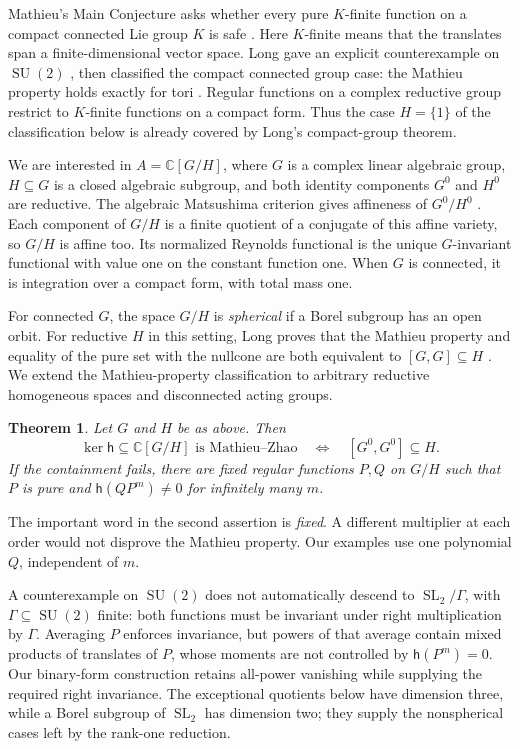\documentclass[11pt]{article}
\numberwithin{equation}{section}
\newtheorem{theorem}{Theorem}[section]
\theoremstyle{definition}
\theoremstyle{remark}
\newcommand{\C}{\mathbb C}
\newcommand{\h}{\mathsf h}
\newcommand{\SL}{\operatorname{SL}}
\newcommand{\SU}{\operatorname{SU}}
\begin{document}
Mathieu's Main Conjecture asks whether every pure $K$-finite function
on a compact connected Lie group $K$ is safe
\cite[pp.~264--265]{Mathieu}. Here $K$-finite means that the translates
span a finite-dimensional vector space. Long gave an explicit
counterexample on $\SU(2)$ \cite[Theorem~4.2]{LongSU2}, then classified
the compact connected group case: the Mathieu property holds exactly
for tori \cite[Theorem~1.1]{LongCompact}. Regular functions on a complex
reductive group restrict to $K$-finite functions on a compact form.
Thus the case $H=\{1\}$ of the classification below is already covered
by Long's compact-group theorem.

We are interested in $A=\C[G/H]$, where $G$ is a complex linear algebraic
group, $H\subseteq G$ is a closed algebraic subgroup, and both identity
components $G^0$ and $H^0$ are reductive. The algebraic Matsushima
criterion gives affineness of $G^0/H^0$
\cite[Proposition~2.2]{Arzhantsev}. Each component of $G/H$ is a finite
quotient of a conjugate of this affine variety, so $G/H$ is affine too.
Its normalized Reynolds functional is the unique $G$-invariant functional
with value one on the constant function one. When $G$ is connected, it
is integration over a compact form, with total mass one.

For connected $G$, the space $G/H$ is \emph{spherical} if a Borel
subgroup has an open orbit. For reductive $H$ in this setting, Long
proves that the Mathieu property and equality of the pure set with
the nullcone are both equivalent to $[G,G]\subseteq H$
\cite[Theorem~1.1]{LongSpherical}. We extend the Mathieu-property classification
to arbitrary reductive homogeneous spaces and disconnected acting groups.

\begin{theorem}\label{thm:classification}
Let $G$ and $H$ be as above. Then
\[
 \ker\h\subseteq\C[G/H]\text{ is Mathieu--Zhao}
 \quad\Longleftrightarrow\quad [G^0,G^0]\subseteq H.
\]
If the containment fails, there are fixed regular functions $P,Q$ on
$G/H$ such that $P$ is pure and $\h(QP^m)\ne0$ for infinitely many $m$.
\end{theorem}

The important word in the second assertion is \emph{fixed}. A different
multiplier at each order would not disprove the Mathieu property. Our
examples use one polynomial $Q$, independent of $m$.

A counterexample on $\SU(2)$ does not automatically descend to
$\SL_2/\Gamma$, with $\Gamma\subseteq\SU(2)$ finite: both functions must be invariant under right
multiplication by $\Gamma$. Averaging $P$ enforces invariance, but
powers of that average contain mixed products of translates of $P$,
whose moments are not controlled by $\h(P^m)=0$. Our binary-form
construction retains all-power vanishing while supplying the required
right invariance. The exceptional quotients below have dimension three,
while a Borel subgroup of $\SL_2$ has dimension two; they supply the
nonspherical cases left by the rank-one reduction.
\end{document}
